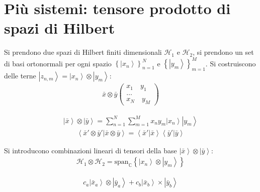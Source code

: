 \chapter{Più sistemi: tensore prodotto di spazi di Hilbert} %
Si prendono due spazi di Hilbert finiti dimensionali $\mathcal{H}_1$ e $\mathcal{H}_2$, si prendono un set di basi ortonormali per ogni spazio $\left\{\left |x_n \right\rangle\right\}^N_{n=1}$ e $\left\{\left |y_m \right\rangle\right\}^M_{m=1}$. Si costruiscono delle terne $\left |z_{n,m} \right\rangle=\left |x_n \right\rangle\otimes \left |y_m \right\rangle$:
\begin{equation}\begin{split}
\bar x\otimes \bar y \left(\begin{matrix}x_1\quad y_1 \\
\dots \\
x_N \quad y_M \end{matrix}\right)
\end{split}\end{equation}

\begin{equation}\begin{split}
\left |\bar x \right\rangle\otimes \left |\bar y \right\rangle=\sum_{n=1}^{N}\sum_{m=1}^{M}{x_ny_m\left |x_n \right\rangle\left |y_m \right\rangle}
\end{split}\end{equation}
\begin{equation}\begin{split}
\left\langle \bar x'\otimes \bar y'|\bar x\otimes\bar y \right\rangle=\left\langle \bar x'|\bar x \right\rangle\left\langle \bar y'|\bar y \right\rangle
\end{split}\end{equation}

Si introducono combinazioni lineari di tensori della base $\left |\bar x \right\rangle\otimes \left |\bar y \right\rangle$:
\begin{equation}\begin{split}
\mathcal{H}_1\otimes \mathcal{H}_2=\textrm{span}_\mathbb{C} \left\{\left |x_n \right\rangle\otimes\left |y_m \right\rangle\right\}
\end{split}\end{equation}

\begin{equation}\begin{split}
c_a\left |\bar x_a \right\rangle\otimes\left |\bar y_a \right\rangle+c_b\left |\bar x_b \right\rangle\times\left |\bar y_b \right\rangle
\end{split}\end{equation}

